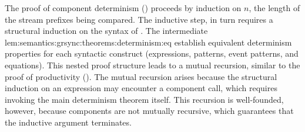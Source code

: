 The proof of component determinism () proceeds by
induction on $n$, the length of the stream prefixes being compared. The inductive step, in turn
requires a structural induction on the syntax of \GRSync. The
intermediate 
{lem:semantics:grsync:theorems:determinism:eq} establish equivalent determinism properties
for each syntactic construct (expressions, patterns,
event patterns, and equations).
%
This nested proof structure leads to a mutual recursion, similar to the proof of productivity
(). The mutual recursion arises because the
structural induction on an expression may encounter a component call, which requires invoking the
main determinism theorem itself. This recursion is well-founded, however, because \GRSync
components are not mutually recursive, which guarantees that the inductive argument terminates.

